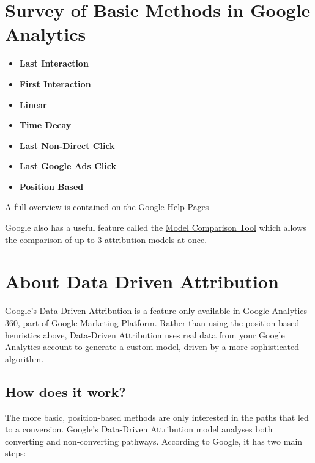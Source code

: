\documentclass[]{book}
\providecommand{\tightlist}{%
  \setlength{\itemsep}{0pt}\setlength{\parskip}{0pt}}
\begin{document}
\hypertarget{survey-of-basic-methods-in-google-analytics}{%
\section{Survey of Basic Methods in Google Analytics}\label{survey-of-basic-methods-in-google-analytics}}

\begin{itemize}
\tightlist
\item
  \textbf{Last Interaction}
\item
  \textbf{First Interaction}
\item
  \textbf{Linear}
\item
  \textbf{Time Decay}
\item
  \textbf{Last Non-Direct Click}
\item
  \textbf{Last Google Ads Click}
\item
  \textbf{Position Based}
\end{itemize}

A full overview is contained on the \href{https://support.google.com/analytics/answer/1665189?hl=en\&ref_topic=3205717}{Google Help Pages}

Google also has a useful feature called the \href{https://support.google.com/analytics/answer/6148697}{Model Comparison Tool}
which allows the comparison of up to 3 attribution models at once.

\hypertarget{about-data-driven-attribution}{%
\section{About Data Driven Attribution}\label{about-data-driven-attribution}}

Google's \href{https://support.google.com/analytics/answer/3264076?\%20hl=en\&ref_topic=3180362}{Data-Driven Attribution} is a feature only available in Google Analytics 360, part of Google Marketing Platform.
Rather than using the position-based heuristics above, Data-Driven Attribution uses real data from your Google
Analytics account to generate a custom model, driven by a more sophisticated algorithm.

\hypertarget{how-does-it-work}{%
\subsection{How does it work?}\label{how-does-it-work}}

The more basic, position-based methods are only interested in the paths that led
to a conversion. Google's Data-Driven Attribution model analyses both converting
and non-converting pathways. According to Google, it has two main steps:
\end{document}
